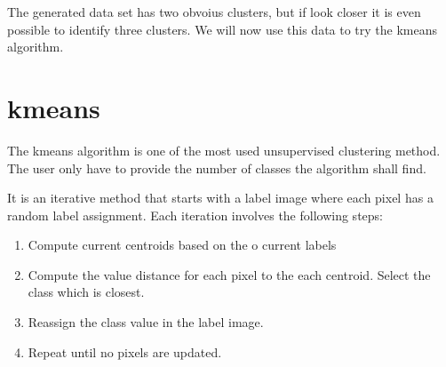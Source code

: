 \documentclass[letterpaper,10pt,english]{sphinxmanual}
\begin{document}
\begin{sphinxVerbatim}[commandchars=\\\{\}]
   \PYG{p}{[}
                        \PYG{p}{]} \PYG{p}{[} \PYG{p}{]}
  
\end{sphinxVerbatim}

\noindent{}

The generated data set has two obvoius clusters, but if look closer it is even possible to identify three clusters. We will now use this data to try the k\sphinxhyphen{}means algorithm.


\section{k\sphinxhyphen{}means}
\label{\detokenize{ML4NeutronImageSegmentation:k-means}}
The k\sphinxhyphen{}means algorithm is one of the most used unsupervised clustering method. The user only have to provide the number of classes the algorithm shall find.

It is an iterative method that starts with a label image where each pixel has a random label assignment. Each iteration involves the following steps:
\begin{enumerate}
%
\item {} 
Compute current centroids based on the o current labels

\item {} 
Compute the value distance for each pixel to the each centroid. Select the class which is closest.

\item {} 
Reassign the class value in the label image.

\item {} 
Repeat until no pixels are updated.

\end{enumerate}
\end{document}

